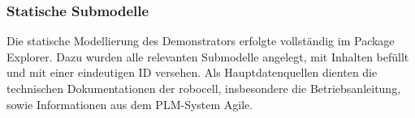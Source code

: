 




\newpage
\subsubsection{Statische Submodelle}
Die statische Modellierung des Demonstrators erfolgte vollständig im Package Explorer.
Dazu wurden alle relevanten Submodelle angelegt, mit Inhalten befüllt und mit einer eindeutigen ID versehen.
Als Hauptdatenquellen dienten die technischen Dokumentationen der robocell, insbesondere die Betriebsanleitung, sowie Informationen aus dem PLM-System Agile.

